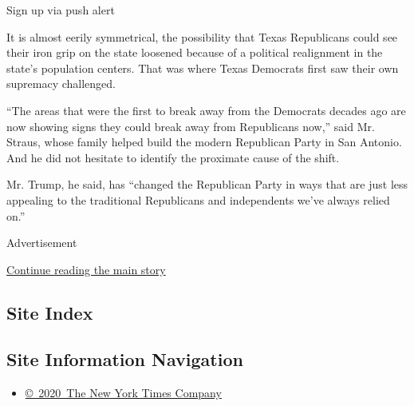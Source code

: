 Sign up via push alert

It is almost eerily symmetrical, the possibility that Texas Republicans
could see their iron grip on the state loosened because of a political
realignment in the state's population centers. That was where Texas
Democrats first saw their own supremacy challenged.

``The areas that were the first to break away from the Democrats decades
ago are now showing signs they could break away from Republicans now,''
said Mr. Straus, whose family helped build the modern Republican Party
in San Antonio. And he did not hesitate to identify the proximate cause
of the shift.

Mr. Trump, he said, has ``changed the Republican Party in ways that are
just less appealing to the traditional Republicans and independents
we've always relied on.''

Advertisement

\protect\hyperlink{after-bottom}{Continue reading the main story}

\hypertarget{site-index}{%
\subsection{Site Index}\label{site-index}}

\hypertarget{site-information-navigation}{%
\subsection{Site Information
Navigation}\label{site-information-navigation}}

\begin{itemize}
\tightlist
\item
  \href{https://help.nytimes3xbfgragh.onion/hc/en-us/articles/115014792127-Copyright-notice}{©~2020~The
  New York Times Company}
\end{itemize}

